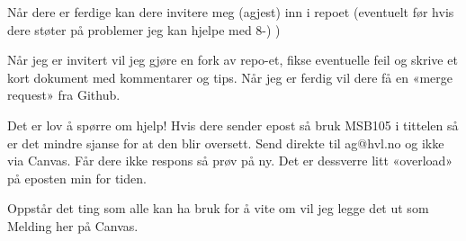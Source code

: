 \documentclass[
  a4paper,
  DIV=11,
  numbers=noendperiod]{scrartcl}
\begin{document}
Når dere er ferdige kan dere invitere meg (agjest) inn i repoet
(eventuelt før hvis dere støter på problemer jeg kan hjelpe med 8-) )

Når jeg er invitert vil jeg gjøre en fork av repo-et, fikse eventuelle
feil og skrive et kort dokument med kommentarer og tips. Når jeg er
ferdig vil dere få en «merge request» fra Github.

Det er lov å spørre om hjelp! Hvis dere sender epost så bruk MSB105 i
tittelen så er det mindre sjanse for at den blir oversett. Send direkte
til ag@hvl.no og ikke via Canvas. Får dere ikke respons så prøv på ny.
Det er dessverre litt «overload» på eposten min for tiden.

Oppstår det ting som alle kan ha bruk for å vite om vil jeg legge det ut
som Melding her på Canvas.
\end{document}
